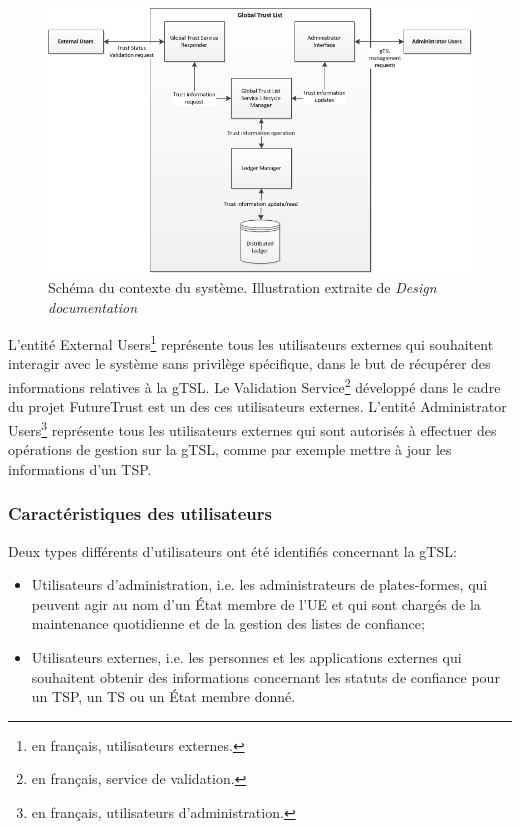 \documentclass{tnreport}
\begin{document}
\begin{figure}[h]
	\centering
	\includegraphics[scale=0.82]{figures/gTSL-SystemContextDiagram}
	\caption{Schéma du contexte du système. Illustration extraite de \textit{Design documentation}~\cite{design-document}}
	\label{fig:system-context-diagram}
\end{figure}

L'entité External Users\footnote{en français, utilisateurs externes.} représente tous les utilisateurs externes qui souhaitent interagir avec le système sans privilège spécifique, dans le but de récupérer des informations relatives à la gTSL. Le Validation Service\footnote{en français, service de validation.} développé dans le cadre du projet FutureTrust est un des ces utilisateurs externes.
L'entité Administrator Users\footnote{en français, utilisateurs d'administration.} représente tous les utilisateurs externes qui sont autorisés à effectuer des opérations de gestion sur la gTSL, comme par exemple mettre à jour les informations d'un TSP.

\subsubsection{Caractéristiques des utilisateurs}

Deux types différents d'utilisateurs ont été identifiés concernant la gTSL:
\begin{itemize}
	\item Utilisateurs d'administration, i.e. les administrateurs de plates-formes, qui peuvent agir au nom d'un État membre de l'UE et qui sont chargés de la maintenance quotidienne et de la gestion des listes de confiance;
	\item Utilisateurs externes, i.e. les personnes et les applications externes qui souhaitent obtenir des informations concernant les statuts de confiance pour un TSP, un TS ou un État membre donné.
\end{itemize}
\end{document}
